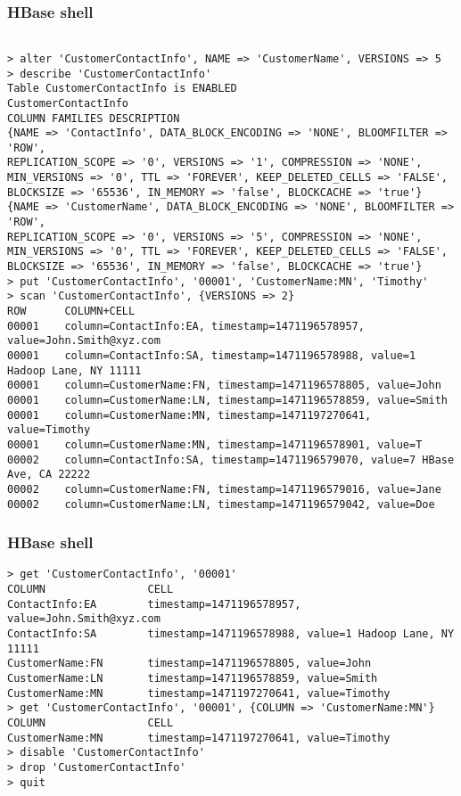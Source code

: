 \documentclass{beamer}
\begin{document}
\begin{frame}[fragile]
 \frametitle{HBase shell}
{\color{mycolorcli}
  \begin{lstlisting}[frame=single, basicstyle=\tiny]

> alter 'CustomerContactInfo', NAME => 'CustomerName', VERSIONS => 5
> describe 'CustomerContactInfo'
Table CustomerContactInfo is ENABLED                                     
CustomerContactInfo
COLUMN FAMILIES DESCRIPTION
{NAME => 'ContactInfo', DATA_BLOCK_ENCODING => 'NONE', BLOOMFILTER => 'ROW', 
REPLICATION_SCOPE => '0', VERSIONS => '1', COMPRESSION => 'NONE', 
MIN_VERSIONS => '0', TTL => 'FOREVER', KEEP_DELETED_CELLS => 'FALSE', 
BLOCKSIZE => '65536', IN_MEMORY => 'false', BLOCKCACHE => 'true'}                                     
{NAME => 'CustomerName', DATA_BLOCK_ENCODING => 'NONE', BLOOMFILTER => 'ROW', 
REPLICATION_SCOPE => '0', VERSIONS => '5', COMPRESSION => 'NONE', 
MIN_VERSIONS => '0', TTL => 'FOREVER', KEEP_DELETED_CELLS => 'FALSE', 
BLOCKSIZE => '65536', IN_MEMORY => 'false', BLOCKCACHE => 'true'}
> put 'CustomerContactInfo', '00001', 'CustomerName:MN', 'Timothy'
> scan 'CustomerContactInfo', {VERSIONS => 2}
ROW      COLUMN+CELL 
00001    column=ContactInfo:EA, timestamp=1471196578957, value=John.Smith@xyz.com 
00001    column=ContactInfo:SA, timestamp=1471196578988, value=1 Hadoop Lane, NY 11111 
00001    column=CustomerName:FN, timestamp=1471196578805, value=John 
00001    column=CustomerName:LN, timestamp=1471196578859, value=Smith 
00001    column=CustomerName:MN, timestamp=1471197270641, value=Timothy 
00001    column=CustomerName:MN, timestamp=1471196578901, value=T 
00002    column=ContactInfo:SA, timestamp=1471196579070, value=7 HBase Ave, CA 22222 
00002    column=CustomerName:FN, timestamp=1471196579016, value=Jane 
00002    column=CustomerName:LN, timestamp=1471196579042, value=Doe
  \end{lstlisting}
}
\end{frame}

\begin{frame}[fragile]
 \frametitle{HBase shell}
{\color{mycolorcli}
  \begin{lstlisting}[frame=single, basicstyle=\tiny]
> get 'CustomerContactInfo', '00001'
COLUMN                CELL 
ContactInfo:EA        timestamp=1471196578957, value=John.Smith@xyz.com 
ContactInfo:SA        timestamp=1471196578988, value=1 Hadoop Lane, NY 11111 
CustomerName:FN       timestamp=1471196578805, value=John 
CustomerName:LN       timestamp=1471196578859, value=Smith 
CustomerName:MN       timestamp=1471197270641, value=Timothy
> get 'CustomerContactInfo', '00001', {COLUMN => 'CustomerName:MN'}
COLUMN                CELL 
CustomerName:MN       timestamp=1471197270641, value=Timothy
> disable 'CustomerContactInfo'
> drop 'CustomerContactInfo'
> quit
  \end{lstlisting}
}

\end{frame}
\end{document}

